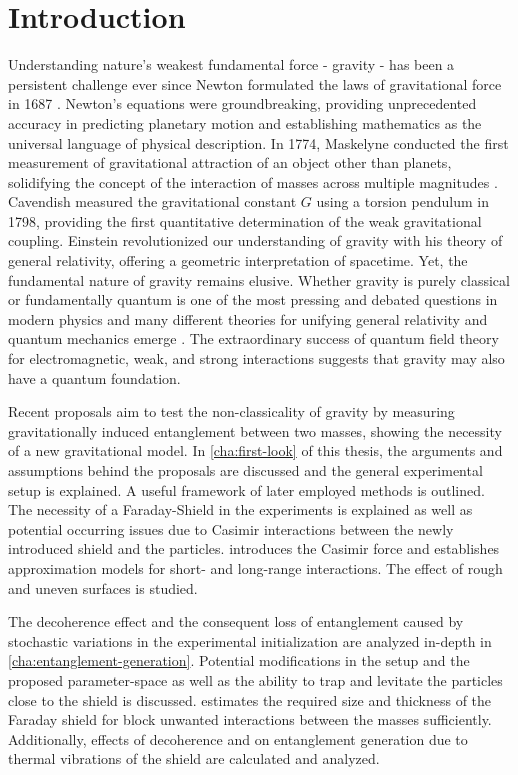 \chapter{Introduction}\label{cha:introduction}

Understanding nature's weakest fundamental force - gravity - has been a persistent challenge ever since Newton formulated the laws of gravitational force in 1687 \cite{Newton_1687}.
Newton's equations were groundbreaking, providing unprecedented accuracy in predicting planetary motion and establishing mathematics as the universal language of physical description.
In 1774, Maskelyne conducted the first measurement of gravitational attraction of an object other than planets, solidifying the concept of the interaction of masses across multiple magnitudes \cite{Maskelyne_1775,Davies_1985}. 
Cavendish measured the gravitational constant $G$ using a torsion pendulum in 1798, providing the first quantitative determination of the weak gravitational coupling.
Einstein revolutionized our understanding of gravity with his theory of general relativity, offering a geometric interpretation of spacetime. Yet, the fundamental nature of gravity remains elusive. Whether gravity is purely classical or fundamentally quantum is one of the most pressing and debated questions in modern physics and many different theories for unifying general relativity and quantum mechanics emerge \cite{Becker_2007, Ashtekar_1986, Oppenheim_2023}.
The extraordinary success of quantum field theory for electromagnetic, weak, and strong interactions suggests that gravity may also have a quantum foundation.

Recent proposals \cite{Bose_2017,Marletto_2017} aim to test the non-classicality of gravity by measuring gravitationally induced entanglement between two masses, showing the necessity of a new gravitational model.
In \cref{cha:first-look} of this thesis, the arguments and assumptions behind the proposals are discussed and the general experimental setup is explained. A useful framework of later employed methods is outlined.
The necessity of a Faraday-Shield in the experiments is explained as well as potential occurring issues due to Casimir interactions \cite{Casimir_1948} between the newly introduced shield and the particles.
 introduces the Casimir force and establishes approximation models for short- and long-range interactions. The effect of rough and uneven surfaces is studied.

The decoherence effect and the consequent loss of entanglement caused by stochastic variations in the experimental initialization are analyzed in-depth in \cref{cha:entanglement-generation}. Potential modifications in the setup and the proposed parameter-space as well as the ability to trap and levitate the particles close to the shield is discussed. 
 estimates the required size and thickness of the Faraday shield for block unwanted interactions between the masses sufficiently. Additionally, effects of decoherence and on entanglement generation due to thermal vibrations of the shield are calculated and analyzed.